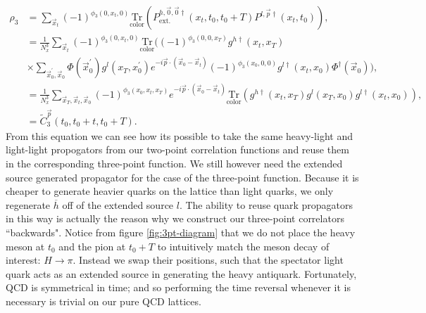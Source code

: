 \begin{equation}\label{eq:3ptcolorwall_derive}
\begin{split}
    \rho_3 &= \sum_{\vec{x}_t} (-1)^{\phi_3(0,x_t,0)}\mathrm{\underset{color}{Tr}}\left(P_{\mathrm{ext.}}^{h,\vec{0},\vec{0}\dagger}(x_t, t_0,t_0+T)P^{l,\vec{p}\dagger}(x_t, t_0)  \right),\\
    &= \frac{1}{N^3_x}\sum_{\vec{x}_t} (-1)^{\phi_3(0,x_t,0)}\mathrm{\underset{color}{Tr}}\bigg((-1)^{\phi_3(0,0,x_T)}g^{h\dagger}(x_t,x_T)\\
    &\times \sum_{\vec{x}^\prime_0,\vec{x}_0}\Phi(\vec{x}^\prime_0)g^l(x_T, x^\prime_0)
    e^{-i\vec{p}\cdot(\vec{x}_0 - \vec{x}_t)}(-1)^{\phi_3(x_0,0,0)}g^{l\dagger}(x_t,x_0)\Phi^\dagger(\vec{x}_0)\bigg),\\
    &= \frac{1}{N^3_x} \sum_{\vec{x}_T,\vec{x}_t, \vec{x}_0} (-1)^{\phi_3(x_0,x_t,x_T)} e^{-i\vec{p}\cdot(\vec{x}_0-\vec{x}_t)}
    \mathrm{\underset{color}{Tr}}\left( g^{h\dagger}(x_t,x_T)g^l(x_T,x_0)g^{l\dagger}(x_t,x_0) \right),\\
    &= \tilde{C}^{\vec{p}}_3(t_0, t_0+t, t_0+T).
\end{split}
\end{equation}
From this equation we can see how its possible to take the same heavy-light and light-light propogators from our two-point correlation functions and reuse them in the corresponding three-point function.  We still however need the extended source generated propagator for the case of the three-point function. Because it is cheaper to generate heavier quarks on the lattice than light quarks, we only regenerate $\overline{h}$ off of the extended source $l$.  The ability to reuse quark propagators in this way is actually the reason why we construct our three-point correlators ``backwards".  Notice from figure \ref{fig:3pt-diagram} that we do not place the heavy meson at $t_0$ and the pion at $t_0+T$ to intuitively match the meson decay of interest: $H\rightarrow \pi$.  Instead we swap their positions, such that the spectator light quark acts as an extended source in generating the heavy antiquark.  Fortunately, QCD is symmetrical in time; and so performing the time reversal whenever it is necessary is trivial on our pure QCD lattices.  


